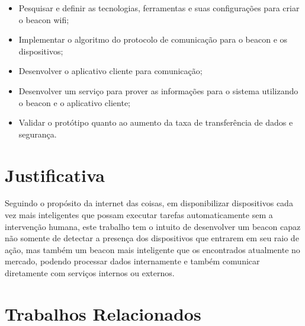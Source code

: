 	\begin{itemize}
		\item Pesquisar e definir as tecnologias, ferramentas e suas configurações para criar o beacon wifi;
		\item Implementar o algoritmo do protocolo de comunicação para o beacon e os dispositivos;
		\item Desenvolver o aplicativo cliente para comunicação;
		\item Desenvolver um serviço para prover as informações para o sistema utilizando o beacon e o aplicativo cliente;
		\item Validar o protótipo quanto ao aumento da taxa de transferência de dados e segurança.
	\end{itemize}

\section{Justificativa}
\label{sec:justificativa}

Seguindo o propósito da internet das coisas, em disponibilizar dispositivos cada vez mais inteligentes que possam executar tarefas automaticamente sem a intervenção humana, este trabalho tem o intuito de desenvolver um beacon capaz não somente de detectar a presença dos dispositivos que entrarem em seu raio de ação, mas também um beacon mais inteligente que os encontrados atualmente no mercado, podendo processar dados internamente e também comunicar diretamente com serviços internos ou externos.

\section{Trabalhos Relacionados}
\label{sec:trabalhos-relacionados}

